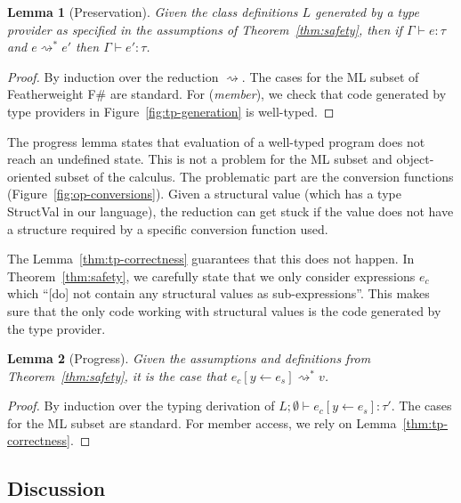 \documentclass[preprint]{sigplanconf}
\newcommand{\ident}[1]{\textnormal{\sffamily #1}}
\newcommand{\reduce}{\rightsquigarrow}
\newtheorem{lemma}{Lemma}
\begin{document}
\begin{lemma}[Preservation]
\label{thm:rs-preservation}
Given the class definitions $L$ generated by a type provider as specified in
the assumptions of Theorem~\ref{thm:safety}, then if $\Gamma \vdash e : \tau$ and 
$e \reduce^{*} e'$ then $\Gamma \vdash e' : \tau$.
\end{lemma}
\begin{proof}
By induction over the reduction $\reduce$. The cases for the ML subset of Featherweight F\# 
are standard. For (\emph{member}), we check that code generated by type providers
in Figure~\ref{fig:tp-generation} is well-typed.
\end{proof}

\noindent
The progress lemma states that evaluation of a well-typed program does not reach an undefined state. 
This is not a problem for the ML subset and object-oriented subset of the calculus. The problematic
part are the conversion functions (Figure~\ref{fig:op-conversions}). Given a structural value 
(which has a type \ident{StructVal} in our language), the reduction can get stuck if the value does
not have a structure required by a specific conversion function used.

The Lemma~\ref{thm:tp-correctness} guarantees that this does not happen. In Theorem~\ref{thm:safety},
we carefully state that we only consider expressions $e_c$ which ``[do] not contain any structural 
values as sub-expressions''. This makes sure that the only code working with structural values is the
code generated by the type provider.

\begin{lemma}[Progress]
\label{thm:rs-progress}
Given the assumptions and definitions from Theorem~\ref{thm:safety}, it is the case that
$e_c[y\leftarrow e_s] \reduce^{*} v$.
\end{lemma}
\begin{proof}
By induction over the typing derivation of $L; \emptyset \vdash e_c[y\leftarrow e_s] : \tau'$. 
The cases for the ML subset are standard. For member access, we rely on Lemma~\ref{thm:tp-correctness}.
\end{proof}


\subsection{Discussion}
\label{sec:safety-discuss}
\end{document}
